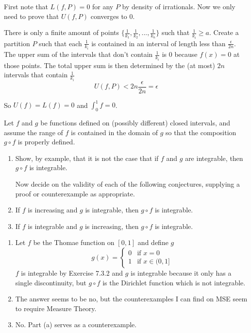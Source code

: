 \documentclass{oxmathproblems}
\begin{document}
\begin{questions}
\begin{solution}
  First note that $L(f, P)=0$ for any $P$ by density of irrationals. Now we only need to prove that $U(f, P)$ converges to 0.

  There is only a finite amount of points $\{\frac{1}{k_{1}}, \frac{1}{k_{2}}, ..., \frac{1}{k_{n}}\}$ such that $\frac{1}{k_{i}} \geq a$.
  Create a partition $P$ such that each $\frac{1}{k_{i}}$ is contained in an interval of length less than $\frac{\epsilon}{2n}$. The upper sum of
  the intervals that don't contain $\frac{1}{k_{i}}$ is 0 because $f(x)=0$ at those points. The total upper sum is then determined by the (at most)
  $2n$ intervals that contain $\frac{1}{k_{i}}$
  \[U(f, P) < 2n\frac{\epsilon}{2n}=\epsilon\]

  So $U(f)=L(f)=0$ and $\int_{0}^{1}f = 0$.
\end{solution}

\miquestion Let $f$ and $g$ be functions defined on (possibly different) closed intervals, and assume the range of $f$ is contained in the domain of $g$
so that the composition $g \circ f$ is properly defined.
\begin{enumerate}[label=(\alph*)]
  \item Show, by example, that it is not the case that if $f$ and $g$ are integrable, then $g \circ f$ is integrable.
  
  Now decide on the validity of each of the following conjectures, supplying a proof or counterexample as appropriate.
  \item If $f$ is increasing and $g$ is integrable, then $g \circ f$ is integrable.
  \item If $f$ is integrable and $g$ is increasing, then $g \circ f$ is integrable.
\end{enumerate}

\begin{solution}
  \begin{enumerate}[label=(\alph*)]
    \item Let $f$ be the Thomae function on $[0, 1]$ and define $g$
    \[g(x) = 
      \begin{cases}
        0 & \text{if } x = 0\\
        1 & \text{if } x \in (0, 1]
      \end{cases}
    \]
    $f$ is integrable by Exercise 7.3.2 and $g$ is integrable because it only has a single discontinuity, but $g \circ f$ is the Dirichlet function which is not integrable.

    \item The answer seems to be no, but the counterexamples I can find on MSE seem to require Measure Theory.
    \item No. Part (a) serves as a counterexample.
  \end{enumerate}
\end{solution}


\end{questions}
\end{document}
